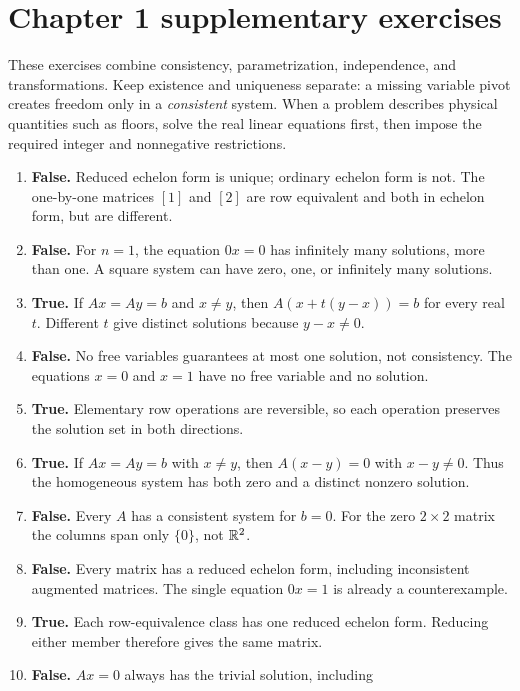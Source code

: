 \section{Chapter 1 supplementary exercises}
These exercises combine consistency, parametrization, independence,
and transformations. Keep existence and uniqueness separate: a missing
variable pivot creates freedom only in a \emph{consistent} system.
When a problem describes physical quantities such as floors, solve the
real linear equations first, then impose the required integer and
nonnegative restrictions.

\begin{enumerate}[label=(\alph*)]
\item \textbf{False.} Reduced echelon form is unique; ordinary echelon
form is not. The one-by-one matrices $[1]$ and $[2]$ are row equivalent
and both in echelon form, but are different.
\item \textbf{False.} For $n=1$, the equation $0x=0$ has infinitely
many solutions, more than one. A square system can have zero, one,
or infinitely many solutions.
\item \textbf{True.} If $Ax=Ay=b$ and $x\ne y$, then
$A(x+t(y-x))=b$ for every real $t$. Different $t$ give distinct
solutions because $y-x\ne0$.
\item \textbf{False.} No free variables guarantees at most one solution,
not consistency. The equations $x=0$ and $x=1$ have no free variable
and no solution.
\item \textbf{True.} Elementary row operations are reversible, so each
operation preserves the solution set in both directions.
\item \textbf{True.} If $Ax=Ay=b$ with $x\ne y$, then
$A(x-y)=0$ with $x-y\ne0$. Thus the homogeneous system has
both zero and a distinct nonzero solution.
\item \textbf{False.} Every $A$ has a consistent system for $b=0$.
For the zero $2\times2$ matrix the columns span only $\{0\}$, not $\mathbb{R}^2$.
\item \textbf{False.} Every matrix has a reduced echelon form, including
inconsistent augmented matrices. The single equation $0x=1$ is already
a counterexample.
\item \textbf{True.} Each row-equivalence class has one reduced echelon
form. Reducing either member therefore gives the same matrix.
\item \textbf{False.} $Ax=0$ always has the trivial solution, including

\end{enumerate}
